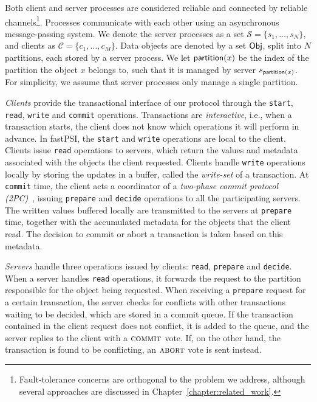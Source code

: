 Both client and server processes are considered reliable and connected by reliable channels\footnote{Fault-tolerance concerns are orthogonal to the problem we address, although several approaches are discussed in Chapter~\ref{chapter:related_work}.}. Processes communicate with each other using an asynchronous message-passing system. We denote the server processes as a set $\mathcal{S} = \{s_1, \dots, s_N\}$, and clients as $\mathcal{C} = \{c_1, \dots, c_M\}$. Data objects are denoted by a set ${\sf Obj}$, split into $N$ partitions, each stored by a server process. We let $\mathsf{partition}(x)$ be the index of the partition the object $x$ belongs to, such that it is managed by server $s_{\mathsf{partition}(x)}$. For simplicity, we assume that server processes only manage a single partition.

\emph{Clients} provide the transactional interface of our protocol through the \texttt{start}, \texttt{read}, \texttt{write} and \texttt{commit} operations. Transactions are \emph{interactive}, i.e., when a transaction starts, the client does not know which operations it will perform in advance. In fastPSI, the \texttt{start} and \texttt{write} operations are local to the client. Clients issue \texttt{read} operations to servers, which return the values and metadata associated with the objects the client requested. Clients handle \texttt{write} operations locally by storing the updates in a buffer, called the \emph{write-set} of a transaction. At \texttt{commit} time, the client acts a coordinator of a \emph{two-phase commit protocol (2PC)}~\citep{bernstein_concurrency}, issuing \texttt{prepare} and \texttt{decide} operations to all the participating servers. The written values buffered locally are transmitted to the servers at \texttt{prepare} time, together with the accumulated metadata for the objects that the client read. The decision to commit or abort a transaction is taken based on this metadata.

\emph{Servers} handle three operations issued by clients: \texttt{read}, \texttt{prepare} and \texttt{decide}. When a server handles \texttt{read} operations, it forwards the request to the partition responsible for the object being requested. When receiving a \texttt{prepare} request for a certain transaction, the server checks for conflicts with other transactions waiting to be decided, which are stored in a commit queue. If the transaction contained in the client request does not conflict, it is added to the queue, and the server replies to the client with a $\text{\sc commit}$ vote. If, on the other hand, the transaction is found to be conflicting, an $\text{\sc abort}$ vote is sent instead.

